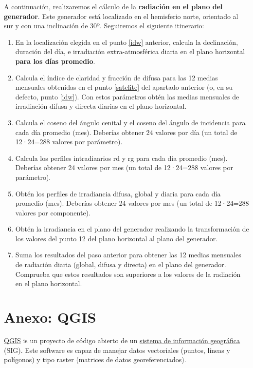 \documentclass[11pt]{article}
\begin{document}
A continuación, realizaremos el cálculo de la \textbf{radiación en el plano del generador}. Este generador está localizado en el hemisferio norte, orientado al sur y con una inclinación de 30º. Seguiremos el siguiente itinerario:

\begin{enumerate}
\item En la localización elegida en el punto \ref{idw} anterior, calcula la declinación, duración del día, e irradiación extra-atmosférica diaria en el plano horizontal \textbf{para los días promedio}.
\item Calcula el índice de claridad y fracción de difusa para las 12 medias mensuales obtenidas en el punto \ref{satelite} del apartado anterior (o, en su defecto, punto \ref{idw}). Con estos parámetros obtén las medias mensuales de irradiación difusa y directa diarias en el plano horizontal.
\item Calcula el coseno del ángulo cenital y el coseno del ángulo de incidencia para cada día promedio (mes). Deberías obtener 24 valores por día (un total de 12·24=288 valores por parámetro).
\item Calcula los perfiles intradiaarios rd y rg para cada dia promedio (mes). Deberías obtener 24 valores por mes (un total de 12·24=288 valores por parámetro).
\item Obtén los perfiles de irradiancia difusa, global y diaria para cada día promedio (mes). Deberías obtener 24 valores por mes (un total de 12·24=288 valores por componente).
\item Obtén la irradiancia en el plano del generador realizando la transformación de los valores del punto 12 del plano horizontal al plano del generador.
\item Suma los resultados del paso anterior para obtener las 12 medias mensuales de radiación diaria (global, difusa y directa) en el plano del generador. Comprueba que estos resultados son superiores a los valores de la radiación en el plano horizontal.
\end{enumerate}

\clearpage

\section*{Anexo: QGIS}
\label{sec:orgb85862a}

\href{https://qgis.org/es/site/}{QGIS} is un proyecto de código abierto de un \href{https://es.wikipedia.org/wiki/Sistema\_de\_informaci\%C3\%B3n\_geogr\%C3\%A1fica}{sistema de información
geográfica} (SIG). Este software es capaz de manejar datos
vectoriales (puntos, líneas y polígonos) y tipo raster (matrices de
datos georeferenciados).
\end{document}
